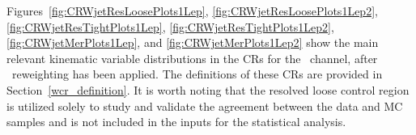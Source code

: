 \label{W+jets_control_region_bg}

Figures~\ref{fig:CRWjetResLoosePlots1Lep}, \ref{fig:CRWjetResLoosePlots1Lep2}, \ref{fig:CRWjetResTightPlots1Lep}, \ref{fig:CRWjetResTightPlots1Lep2}, \ref{fig:CRWjetMerPlots1Lep}, and \ref{fig:CRWjetMerPlots1Lep2} show the main relevant kinematic variable distributions in the \Wjets CRs for the \olep\ channel, after \mjjtag\ reweighting has been applied.
The definitions of these CRs are provided in Section~\ref{wcr_definition}. It is worth noting that the resolved loose \Wjets control region is utilized solely to study and validate the agreement between the data and MC samples and is not included in the inputs for the statistical analysis.


\begin{figure}[ht]
    \centering
     \\

\end{figure}
